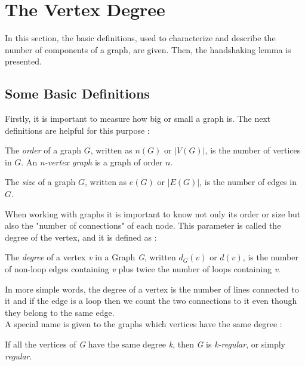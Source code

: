 \section{The Vertex Degree}
In this section, the basic definitions, used to characterize and describe the number of components of a graph, are given. Then, the handshaking lemma is presented.

\subsection{Some Basic Definitions}
Firstly, it is important to measure how big or small a graph is. The next definitions are helpful for this purpose \cite{douglas}:\\
 
\begin{defn}
	The \textit{order} of a graph $G$, written as $n(G)$ or $|V(G)|$, is the number of vertices in $G$. An \textit{n-vertex graph} is a graph of order $n$.\\
\end{defn}

\begin{defn}
	The \textit{size} of a graph $G$, written as $e(G)$ or $|E(G)|$, is the number of edges in $G$.\\
\end{defn}

When working with graphs it is important to know not only its order or size but also the "number of connections" of each node. This parameter is called the degree of the vertex, and it is defined as \cite{douglas}:\\

\begin{defn}
\label{degree}
	The \textit{degree} of a vertex \textit{v} in a Graph \textit{G}, written $d_{G}(v)$ or $d(v)$, is the number of non-loop edges containing \textit{v} plus twice the number of loops containing \textit{v}.
\end{defn} 

In more simple words, the degree of a vertex is the number of lines connected to it and if the edge is a loop then we count the two connections to it even though they belong to the same edge.\\

A special name is given to the graphs which vertices have the same degree \cite{diestel}:
\begin{defn}
\label{regular}
If all the vertices of \textit{G} have the same degree \textit{k}, then \textit{G} is \textit{k-regular}, or simply \textit{regular}.
\end{defn} 

